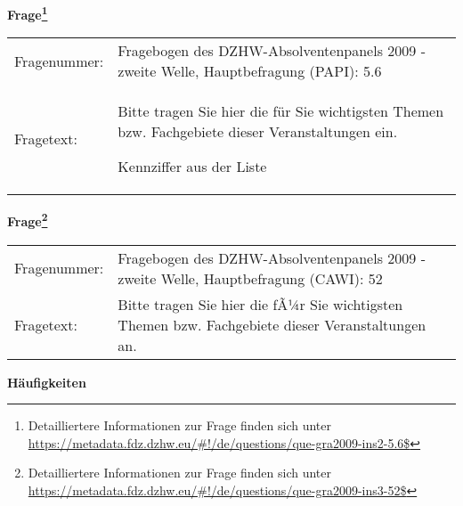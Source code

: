 				\vspace*{0.5cm}
                \noindent\textbf{Frage\footnote{Detailliertere Informationen zur Frage finden sich unter
		              \url{https://metadata.fdz.dzhw.eu/\#!/de/questions/que-gra2009-ins2-5.6$}}}\\
				\begin{tabularx}{\hsize}{@{}lX}
					Fragenummer: &
					  Fragebogen des DZHW-Absolventenpanels 2009 - zweite Welle, Hauptbefragung (PAPI):
					  5.6
 \\
					Fragetext: & Bitte tragen Sie hier die für Sie wichtigsten Themen bzw. Fachgebiete dieser Veranstaltungen ein.\par  Kennziffer aus der Liste \\
				\end{tabularx}
				\vspace*{0.5cm}
                \noindent\textbf{Frage\footnote{Detailliertere Informationen zur Frage finden sich unter
		              \url{https://metadata.fdz.dzhw.eu/\#!/de/questions/que-gra2009-ins3-52$}}}\\
				\begin{tabularx}{\hsize}{@{}lX}
					Fragenummer: &
					  Fragebogen des DZHW-Absolventenpanels 2009 - zweite Welle, Hauptbefragung (CAWI):
					  52
 \\
					Fragetext: & Bitte tragen Sie hier die fÃ¼r Sie wichtigsten Themen bzw. Fachgebiete dieser Veranstaltungen an. \\
				\end{tabularx}





        		\vspace*{0.5cm}
                \noindent\textbf{Häufigkeiten}

